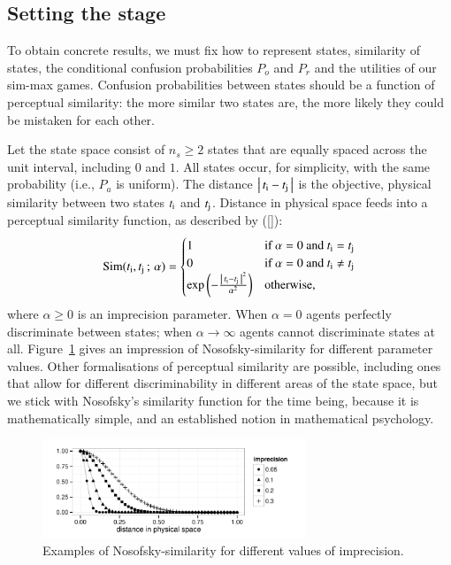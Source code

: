 \documentclass[12pt,english]{article}
\newcommand{\imprecision}{\ensuremath{\alpha}} %
\newcommand{\ns}{\ensuremath{n_s}} %
\newcommand{\similarity}{\ensuremath{\mathrm{Sim}}} %
\numberwithin{equation}{section}
\newcommand{\citetbjps}[1]{\citeauthor{#1} ([\citeyear{#1}])}
\begin{document}
\subsection{Setting the stage}
\label{sec:setting-stage}

To obtain concrete results, we must fix how to represent states, similarity of states, the
conditional confusion probabilities $P_o$ and $P_r$ and the utilities of our sim-max
games. Confusion probabilities between states should be a function of perceptual similarity:
the more similar two states are, the more likely they could be mistaken for each other. 

Let the state space consist of $\ns \ge 2$ states that are equally spaced across the unit
interval, including $0$ and $1$. All states occur, for simplicity, with the same probability
(i.e., $P_a$ is uniform).  The distance $\left \lvert \, t_{\mathrm{i}} - t_{\mathrm{j}} \, \right\rvert$ is the objective,
physical similarity between two states $t_{\mathrm{i}}$ and $t_{\mathrm{j}}$. Distance in physical
space feeds into a perceptual similarity function, as described by
\citetbjps{Nosofsky1986:Attention-Simil}:
\begin{align*}
  \similarity(\mystate{i}, \mystate{j} \myts ; \myts \imprecision) =
      \begin{cases}
    1 & \textrm{if } \imprecision = 0 \textrm{ and } \mystate{i} = \mystate{j} \\
    0 & \textrm{if } \imprecision = 0 \textrm{ and } \mystate{i} \neq \mystate{j} \\
 \expo \left ( -  \frac{\card{\mystate{i} - \mystate{j}}^2}{ \imprecision^2} \right ) & \textrm{otherwise,} \\
    \end{cases}
\end{align*}
where $\imprecision \ge 0$ is an imprecision parameter. When $\imprecision=0$ agents perfectly
discriminate between states; when $\imprecision \rightarrow \infty$ agents cannot discriminate
states at all. Figure~\ref{fig:NosofskySim} gives an impression of Nosofsky-similarity for
different parameter values. Other formalisations of perceptual similarity are possible,
including ones that allow for different discriminability in different areas of the state space,
but we stick with Nosofsky's similarity function for the time being, because it is
mathematically simple, and an established notion in mathematical psychology.

\begin{figure}
  \centering

  \includegraphics[width=0.7\textwidth]{plots/NosofskySim.pdf}

  \caption{Examples of Nosofsky-similarity for different values of
    imprecision.}
  \label{fig:NosofskySim}
\end{figure}
\end{document}
